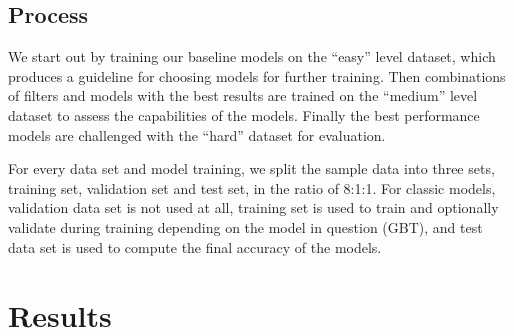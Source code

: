\documentclass[
	a4paper, %
	10pt, %
	unnumberedsections, %
	twoside, %
]{t0004}
\begin{document}
\subsection{Process}

We start out by training our baseline models on the ``easy'' level dataset, which produces a guideline for choosing models for further training. Then combinations of filters and models with the best results are trained on the ``medium'' level dataset to assess the capabilities of the models. Finally the best performance models are challenged with the ``hard'' dataset for evaluation.

For every data set and model training, we split the sample data into three sets, training set, validation set and test set, in the ratio of 8:1:1. For classic models, validation data set is not used at all, training set is used to train and optionally validate during training depending on the model in question (GBT), and test data set is used to compute the final accuracy of the models.

\section{Results}
\end{document}

